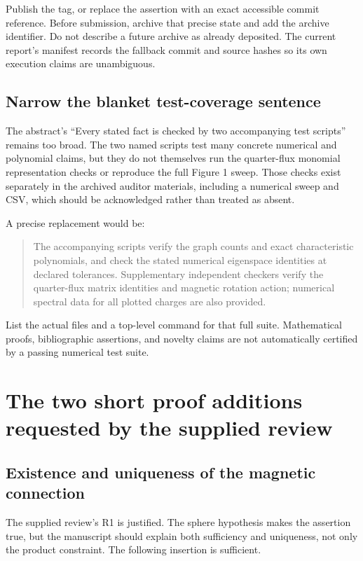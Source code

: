 \documentclass[11pt,a4paper]{article}
\begin{document}
Publish the tag, or replace the assertion with an exact accessible commit reference. Before submission, archive that precise state and add the archive identifier. Do not describe a future archive as already deposited. The current report's manifest records the fallback commit and source hashes so its own execution claims are unambiguous.

\subsection{Narrow the blanket test-coverage sentence}
The abstract's ``Every stated fact is checked by two accompanying test scripts'' remains too broad. The two named scripts test many concrete numerical and polynomial claims, but they do not themselves run the quarter-flux monomial representation checks or reproduce the full Figure 1 sweep. Those checks exist separately in the archived auditor materials, including a numerical sweep and CSV, which should be acknowledged rather than treated as absent.

A precise replacement would be:
\begin{quote}
The accompanying scripts verify the graph counts and exact characteristic polynomials, and check the stated numerical eigenspace identities at declared tolerances. Supplementary independent checkers verify the quarter-flux matrix identities and magnetic rotation action; numerical spectral data for all plotted charges are also provided.
\end{quote}
List the actual files and a top-level command for that full suite. Mathematical proofs, bibliographic assertions, and novelty claims are not automatically certified by a passing numerical test suite.

\section{The two short proof additions requested by the supplied review}
\subsection{Existence and uniqueness of the magnetic connection}
The supplied review's R1 is justified. The sphere hypothesis makes the assertion true, but the manuscript should explain both sufficiency and uniqueness, not only the product constraint. The following insertion is sufficient.
\end{document}
